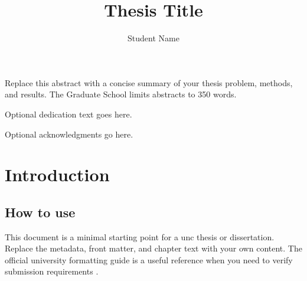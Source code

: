 \documentclass[12pt]{uncthesis}
\title{Thesis Title}
\author{Student Name}
\begin{document}
\frontmatter

\maketitlepage
\makecopyrightpage

\begin{uncabstract}
  Replace this abstract with a concise summary of your thesis problem,
  methods, and results. The Graduate School limits abstracts to 350 words.
\end{uncabstract}

\begin{uncdedication}
  Optional dedication text goes here.
\end{uncdedication}

\begin{uncacknowledgments}
  Optional acknowledgments go here.
\end{uncacknowledgments}


\setcounter{tocdepth}{1}
\tableofcontents
\listoftables
\listoffigures
\makelistofabbreviations

\mainmatter

\chapter{Introduction}

\section{How to use}

This document is a minimal starting point for a \gls{unc} thesis or
dissertation. Replace the metadata, front matter, and chapter text with
your own content. The official university formatting guide is a useful
reference when you need to verify submission requirements
\cite{unc-dissertation-guide}.
\end{document}
